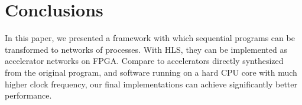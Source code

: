 \documentclass{sig-alternate}
\begin{document}
\section{Conclusions}
\label{conclude}
In this paper, we presented a framework with which sequential programs can be
transformed to networks of processes. With HLS, they can be implemented as accelerator networks on FPGA. Compare to accelerators directly synthesized from the original program, and software running on a hard CPU core with much higher clock frequency, our final implementations can achieve significantly better performance.

\end{document}
